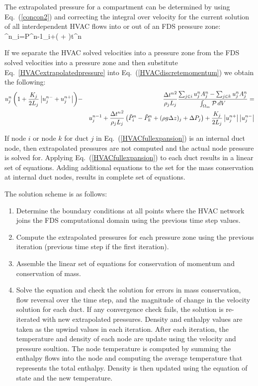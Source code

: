 The extrapolated pressure for a compartment can be determined by using Eq.~(\ref{concon2}) and correcting the integral over velocity for the current solution of
all interdependent HVAC flows into or out of an FDS pressure zone:
\be {}^n_i=P^{n-1}_i+\left( + \right)\Delta t^n
   \label{HVACextrapolatedpressure} \ee

If we separate the HVAC solved velocities into a pressure zone from the FDS solved velocities into a pressure zone and then substitute Eq.~\ref{HVACextrapolatedpressure} into
Eq.~(\ref{HVACdiscretemomentum}) we obtain the following:
\begin{eqnarray}
   u^n_j \left( 1+\frac{K_j}{2 L_j} \left| u^{n-}_j+u^{n+}_j \right| \right) &-&
    \frac{\Delta {t^n}^2}{\rho_j L_j} \frac{{\sum_{j\in i} u^n_j A^n_j}-{\sum_{j\in k} u^n_j A^n_j}}{{\int_{\Omega_m} {\cal P} \, dV}}= \nonumber \\
  & & u^{n-1}_j+ \frac{\Delta {t^n}^2}{\rho_j L_j}
  \left(\tilde{P}^n_i-\tilde{P}^n_k +  (\rho g \Delta z)_j + \Delta P_j \right) +
  \frac{K_j}{2 L_j}\left|u^{n+}_j\right| \left|u^{n-}_j\right| \label{HVACfullexpansion}
\end{eqnarray}

If node $i$ or node $k$ for duct $j$ in Eq.~(\ref{HVACfullexpansion}) is an internal duct node, then extrapolated pressures are not computed and the actual node pressure is solved for.
Applying Eq.~(\ref{HVACfullexpansion}) to each duct results in a linear set of equations.
Adding additional equations to the set for the mass conservation at internal duct nodes, results in complete set of equations.

The solution scheme is as follows:

\begin{enumerate}
\item Determine the boundary conditions at all points where the HVAC network joins the FDS computational domain using the previous time step values.
\item Compute the extrapolated pressures for each pressure zone using the previous iteration (previous time step if the first iteration).
\item Assemble the linear set of equations for conservation of momentum and conservation of mass.
\item Solve the equation and check the solution for errors in mass conservation, flow reversal over the time step, and the magnitude of change in the velocity solution for each duct.  If any convergence check fails, the solution is re-iterated with new extrapolated pressures.  Density and enthalpy values are taken as the upwind values in each iteration.  After each iteration, the temperature and density of each node are update using the velocity and pressure soultion.  The node temperature is computed by summing the enthalpy flows into the node and computing the average temperature that represents the total enthalpy.  Density is then updated using the equation of state and the new temperature.
\end{enumerate}

